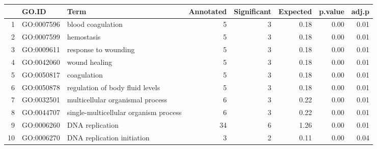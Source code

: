 \begin{table}[ht]
\centering
\begin{tabular}{rllrrrrr}
  \hline
 & GO.ID & Term & Annotated & Significant & Expected & p.value & adj.p \\ 
  \hline
1 & GO:0007596 & blood coagulation &   5 &   3 & 0.18 & 0.00 & 0.01 \\ 
  2 & GO:0007599 & hemostasis &   5 &   3 & 0.18 & 0.00 & 0.01 \\ 
  3 & GO:0009611 & response to wounding &   5 &   3 & 0.18 & 0.00 & 0.01 \\ 
  4 & GO:0042060 & wound healing &   5 &   3 & 0.18 & 0.00 & 0.01 \\ 
  5 & GO:0050817 & coagulation &   5 &   3 & 0.18 & 0.00 & 0.01 \\ 
  6 & GO:0050878 & regulation of body fluid levels &   5 &   3 & 0.18 & 0.00 & 0.01 \\ 
  7 & GO:0032501 & multicellular organismal process &   6 &   3 & 0.22 & 0.00 & 0.01 \\ 
  8 & GO:0044707 & single-multicellular organism process &   6 &   3 & 0.22 & 0.00 & 0.01 \\ 
  9 & GO:0006260 & DNA replication &  34 &   6 & 1.26 & 0.00 & 0.01 \\ 
  10 & GO:0006270 & DNA replication initiation &   3 &   2 & 0.11 & 0.00 & 0.04 \\ 
   \hline
\end{tabular}
\end{table}
